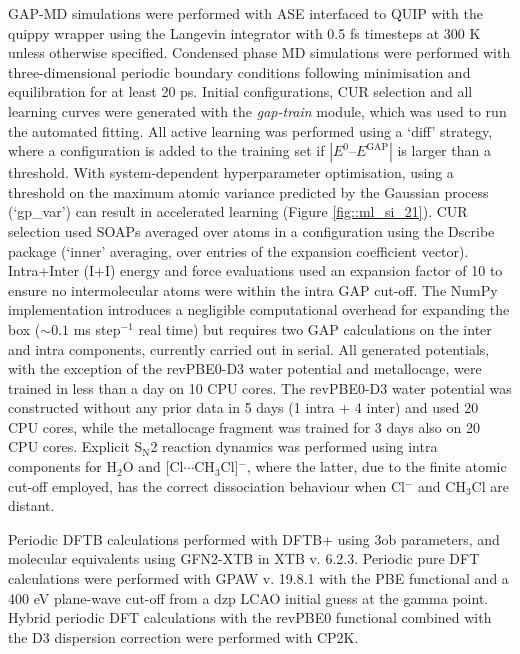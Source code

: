 \documentclass[../../main.tex]{subfiles}
\begin{document}
GAP-MD simulations were performed with ASE\cite{HjorthLarsen2017} interfaced to QUIP with the quippy wrapper using the Langevin integrator with 0.5 fs timesteps at 300 K unless otherwise specified. Condensed phase MD simulations were performed with three-dimensional periodic boundary conditions following minimisation and equilibration for at least 20 ps. Initial configurations, CUR\cite{Mahoney2009} selection and all learning curves were generated with the \emph{gap-train} module, which was used to run the automated fitting.\cite{gaptrain} All active learning was performed using a ‘diff’ strategy, where a configuration is added to the training set if $|E^0 – E^\text{GAP}|$ is larger than a threshold. With system-dependent hyperparameter optimisation, using a threshold on the maximum atomic variance predicted by the Gaussian process (`gp\_var’) can result in accelerated learning (Figure \ref{fig::ml_si_21}). CUR selection used SOAPs averaged over atoms in a configuration using the Dscribe\cite{Himanen2020} package (`inner’ averaging, over entries of the expansion coefficient vector). Intra+Inter (I+I) energy and force evaluations used an expansion factor of 10 to ensure no intermolecular atoms were within the intra GAP cut-off. The NumPy\cite{Numpy} implementation introduces a negligible computational overhead for expanding the box ($\sim0.1$ ms step$^{-1}$ real time) but requires two GAP calculations on the inter and intra components, currently carried out in serial. All generated potentials, with the exception of the revPBE0-D3 water potential and metallocage, were trained in less than a day on 10 CPU cores. The revPBE0-D3 water potential was constructed without any prior data in 5 days (1 intra + 4 inter) and used 20 CPU cores, while the metallocage fragment was trained for 3 days also on 20 CPU cores. Explicit S${}_\text{N}$2 reaction dynamics was performed using intra components for H${}_2$O and [Cl$\cdots$CH${}_3$Cl]${}^{-}$, where the latter, due to the finite atomic cut-off employed, has the correct dissociation behaviour when Cl${}^{-}$ and CH${}_3$Cl are distant.

Periodic DFTB calculations performed with DFTB+\cite{Hourahine2020} using 3ob\cite{Gaus2013} parameters, and molecular equivalents using GFN2-XTB\cite{Bannwarth2019} in XTB v. 6.2.3. Periodic pure DFT calculations were performed with GPAW\cite{Mortensen2005, Enkovaara2010} v. 19.8.1 with the PBE\cite{Perdew1996} functional and a 400 eV plane-wave cut-off from a dzp LCAO initial guess at the gamma point. Hybrid periodic DFT calculations with the revPBE0\cite{Zhang1998, Adamo1999} functional combined with the D3\cite{Grimme2010} dispersion correction were performed with CP2K.\cite{Kuhne2020}
\end{document}
